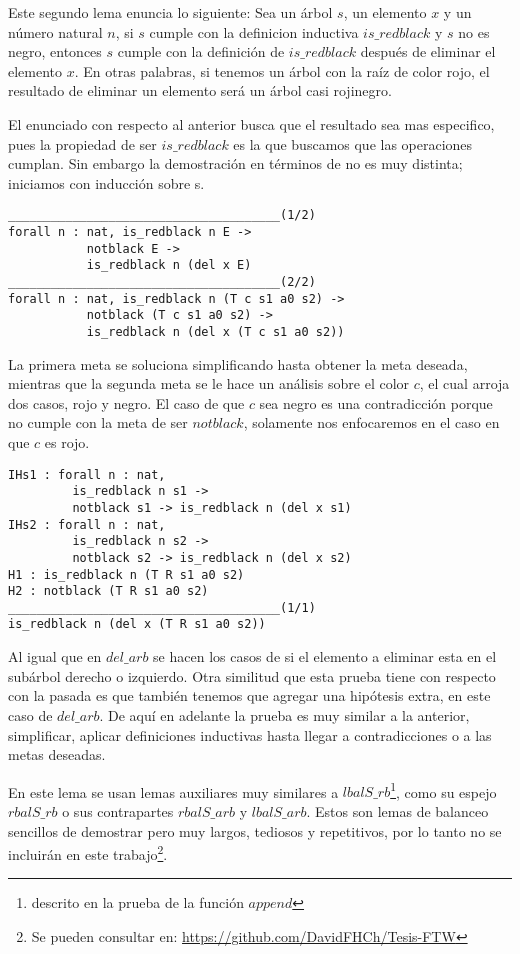 Este segundo lema enuncia lo siguiente: Sea un \'arbol $s$, un elemento $x$ y un n\'umero natural
$n$, si $s$ cumple con la definicion inductiva $is\_redblack$ y $s$ no es negro, entonces $s$
cumple con la definición de $is\_redblack$ después de eliminar el elemento $x$. En otras palabras,
si tenemos un \'arbol con la raíz de color rojo, el resultado de eliminar un elemento ser\'a un
\'arbol casi rojinegro.

El enunciado con respecto al anterior busca que el resultado sea mas especifico, pues la propiedad
de ser $is\_redblack$ es la que buscamos que las operaciones cumplan. Sin embargo la demostraci\'on
en términos de {\coq} no es muy distinta; iniciamos con inducci\'on sobre s.

\begin{verbatim}
______________________________________(1/2)
forall n : nat, is_redblack n E ->
           notblack E ->
           is_redblack n (del x E)
______________________________________(2/2)
forall n : nat, is_redblack n (T c s1 a0 s2) ->
           notblack (T c s1 a0 s2) ->
           is_redblack n (del x (T c s1 a0 s2))
\end{verbatim}

La primera meta se soluciona simplificando hasta obtener la meta deseada, mientras que la segunda
meta se le hace un análisis sobre el color $c$, el cual arroja dos casos, rojo y negro. El caso de
que $c$ sea negro es una contradicci\'on porque no cumple con la meta de ser $notblack$, solamente
nos enfocaremos en el caso en que $c$ es rojo.

\begin{verbatim}
IHs1 : forall n : nat,
         is_redblack n s1 ->
         notblack s1 -> is_redblack n (del x s1)
IHs2 : forall n : nat,
         is_redblack n s2 ->
         notblack s2 -> is_redblack n (del x s2)
H1 : is_redblack n (T R s1 a0 s2)
H2 : notblack (T R s1 a0 s2)
______________________________________(1/1)
is_redblack n (del x (T R s1 a0 s2))
\end{verbatim}

Al igual que en $del\_arb$ se hacen los casos de si el elemento a eliminar esta en el subárbol
derecho o izquierdo. Otra similitud que esta prueba tiene con respecto con la pasada es que también
tenemos que agregar una hipótesis extra, en este caso de $del\_arb$. De aquí en adelante la prueba
es muy similar a la anterior, simplificar, aplicar definiciones inductivas hasta llegar a
contradicciones o a las metas deseadas.

En este lema se usan lemas auxiliares muy similares a $lbalS\_rb$\footnote{descrito en la prueba de
la  funci\'on $append$}, como su espejo $rbalS\_rb$ o sus contrapartes $rbalS\_arb$ y $lbalS\_arb$.
Estos son lemas de balanceo sencillos de demostrar pero muy largos, tediosos y repetitivos, por lo
tanto no se incluirán en este trabajo\footnote{Se pueden consultar en: \url{https://github.com/DavidFHCh/Tesis-FTW}}.

